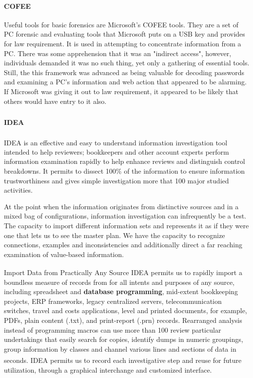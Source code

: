 {\paragraph{COFEE}
Useful tools for basic forensics are Microsoft's COFEE tools. They are a set of PC forensic and evaluating tools that Microsoft puts on a USB key and provides for law requirement. It is used in attempting to concentrate information from a PC. There was some apprehension that it was an "indirect access", however, individuals demanded it was no such thing, yet only a gathering of essential tools. Still, the this framework was advanced as being valuable for decoding passwords and examining a PC's information and web action that appeared to be alarming. If Microsoft was giving it out to law requirement, it appeared to be likely that others would have entry to it also.


\paragraph{IDEA\textsuperscript{\textregistered}}
IDEA\textsuperscript{\textregistered} is an effective and easy to understand information investigation tool intended to help reviewers; bookkeepers and other account experts perform information examination rapidly to help enhance reviews and distinguish control breakdowns. It permits to dissect 100\% of the information to ensure information trustworthiness and gives simple investigation more that 100 major studied activities. 

At the point when the information originates from distinctive sources and in a mixed bag of configurations, information investigation can infrequently be a test. The capacity to import different information sets and represents it as if they were one that lets us to see the master plan. We have the capacity to recognize connections, examples and inconsistencies and additionally direct a far reaching examination of value-based information. 

Import Data from Practically Any Source IDEA\textsuperscript{\textregistered} permits us to rapidly import a boundless measure of records from for all intents and purposes of any source, including spreadsheet and \textbf{database programming}, mid-extent bookkeeping projects, ERP frameworks, legacy centralized servers, telecommunication switches, travel and costs applications, level and printed documents, for example, PDFs, plain content (.txt), and print-report (.prn) records. Rearranged analysis instead of programming macros can use more than 100 review particular undertakings that easily search for copies, identify dumps in numeric groupings, group information by classes and channel various lines and sections of data in seconds. IDEA\textsuperscript{\textregistered} permits us to record each investigative step and reuse for future utilization, through a graphical interchange and customized interface. 

}
